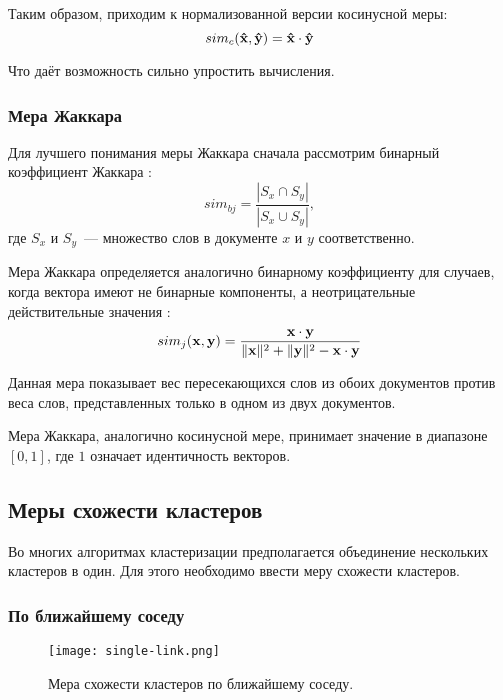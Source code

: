 Таким образом, приходим к нормализованной версии косинусной меры:
\begin{equation}
    sim_c(\boldsymbol{\mathbf{\hat{x}}},\boldsymbol{\mathbf{\hat{y}}})=\boldsymbol{\mathbf{\hat{x}}}\cdot\boldsymbol{\mathbf{\hat{y}}}
\end{equation}

Что даёт возможность сильно упростить вычисления.

\subsubsection{Мера Жаккара}
Для лучшего понимания меры Жаккара сначала рассмотрим бинарный коэффициент Жаккара \cite{strehl02}:
\begin{equation}
    sim_{bj}=\frac{|S_x\cap S_y|}{|S_x\cup S_y|},
\end{equation}
где $S_x$ и $S_y$~--- множество слов в документе $x$ и $y$ соответственно.

Мера Жаккара определяется аналогично бинарному коэффициенту для случаев, когда вектора имеют не бинарные компоненты, а неотрицательные действительные значения \cite{manning09}:
\begin{equation}
    sim_j(\boldsymbol{\mathbf{x}},\boldsymbol{\mathbf{y}})=\frac{\boldsymbol{\mathbf{x}}\cdot\boldsymbol{\mathbf{y}}}{\lVert\boldsymbol{\mathbf{x}}\rVert^2 + \lVert\boldsymbol{\mathbf{y}}\rVert^2-\boldsymbol{\mathbf{x}}\cdot\boldsymbol{\mathbf{y}}}
\end{equation}

Данная мера показывает вес пересекающихся слов из обоих документов против веса слов, представленных только в одном из двух документов.

Мера Жаккара, аналогично косинусной мере, принимает значение в диапазоне $[0,1]$, где $1$ означает идентичность векторов.

\subsection{Меры схожести кластеров}
Во многих алгоритмах кластеризации предполагается объединение нескольких кластеров в один. Для этого необходимо ввести меру схожести кластеров.

\subsubsection{По ближайшему соседу}
\begin{figure}[h]
    \centering
    \texttt{[image: single-link.png]}
    \caption{Мера схожести кластеров по ближайшему соседу.}
    \label{fig:single-link}
\end{figure}

